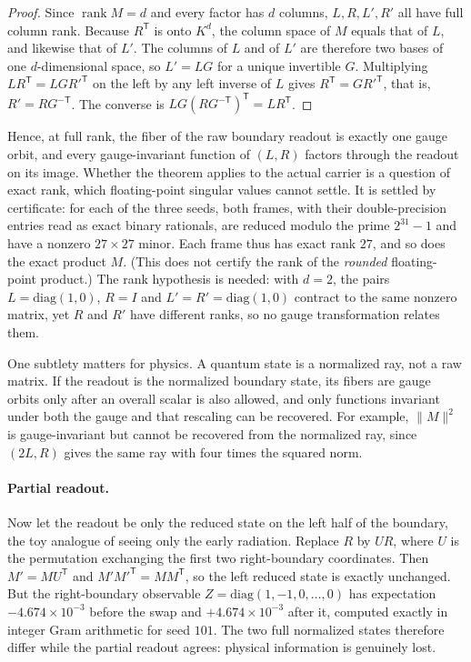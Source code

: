 \begin{proof}
Since \(\operatorname{rank}M=d\) and every factor has \(d\) columns, \(L,R,L',R'\) all have full column rank. Because
\(R^{\mathsf T}\) is onto \(K^d\), the column space of \(M\) equals that of \(L\), and likewise that of \(L'\). The
columns of \(L\) and of \(L'\) are therefore two bases of one \(d\)-dimensional space, so \(L'=LG\) for a unique
invertible \(G\). Multiplying \(LR^{\mathsf T}=LGR'^{\mathsf T}\) on the left by any left inverse of \(L\) gives
\(R^{\mathsf T}=GR'^{\mathsf T}\), that is, \(R'=RG^{-\mathsf T}\). The converse is
\(LG(RG^{-\mathsf T})^{\mathsf T}=LR^{\mathsf T}\).
\end{proof}

Hence, at full rank, the fiber of the raw boundary readout is exactly one gauge orbit, and every gauge-invariant
function of \((L,R)\) factors through the readout on its image. Whether the theorem applies to the actual carrier is a
question of exact rank, which floating-point singular values cannot settle. It is settled by certificate: for each of
the three seeds, both frames, with their double-precision entries read as exact binary rationals, are reduced modulo the prime
\(2^{31}-1\) and have a nonzero \(27\times27\) minor. Each frame thus has exact rank \(27\), and so does the exact product
\(M\). (This does not certify the rank of the \emph{rounded} floating-point product.) The rank hypothesis is needed:
with \(d=2\), the pairs \(L=\mathrm{diag}(1,0)\), \(R=I\) and \(L'=R'=\mathrm{diag}(1,0)\) contract to the same
nonzero matrix, yet \(R\) and \(R'\) have different ranks, so no gauge transformation relates them.

One subtlety matters for physics. A quantum state is a normalized ray, not a raw matrix. If the readout is the
normalized boundary state, its fibers are gauge orbits only after an overall scalar is also allowed, and only
functions invariant under both the gauge and that rescaling can be recovered. For example, \(\|M\|^2\) is
gauge-invariant but cannot be recovered from the normalized ray, since \((2L,R)\) gives the same ray with four times
the squared norm.

\paragraph{Partial readout.} Now let the readout be only the reduced state on the left half of the boundary, the toy
analogue of seeing only the early radiation. Replace \(R\) by \(UR\), where \(U\) is the permutation exchanging the
first two right-boundary coordinates. Then \(M'=MU^{\mathsf T}\) and \(M'M'^{\mathsf T}=MM^{\mathsf T}\), so the left
reduced state is exactly unchanged. But the right-boundary observable \(Z=\mathrm{diag}(1,-1,0,\dots,0)\) has
expectation \(-4.674\times10^{-3}\) before the swap and \(+4.674\times10^{-3}\) after it, computed exactly in integer
Gram arithmetic for seed \(101\). The two full normalized states therefore differ while the partial readout agrees:
physical information is genuinely lost.


